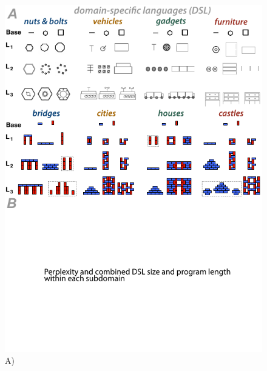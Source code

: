 \documentclass[10pt,letterpaper]{article}
\begin{document}
\begin{figure}
  \begin{center}
  \includegraphics[width=0.98\linewidth]{figures/lax_libraries.pdf}
  \caption{A) }
  \label{fig:libraries_correlations}
  \end{center}
  \end{figure}
\end{document}
